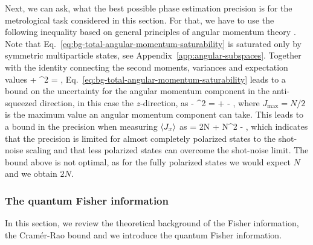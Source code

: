 Next, we can ask, what the best possible phase estimation precision is for the metrological task considered in this section.
For that, we have to use the following inequality based on general principles of angular momentum theory
\be
  \label{eq:bg-total-angular-momentum-saturability}
   \leqslant {}.
\ee
Note that Eq.~\eqref{eq:bg-total-angular-momentum-saturability} is saturated only by symmetric multiparticle states, see Appendix~\ref{app:angular-subspaces}.
Together with the identity connecting the second moments, variances and expectation values
\be
   + ^2 = ,
\ee
Eq.~\eqref{eq:bg-total-angular-momentum-saturability} leads to a bound on the uncertainty for the angular momentum component in the anti-squeezed direction, in this case the $z$-direction, as
\be
   \leqslant {} - ^2 =  +  - \rpar,
\ee
where $J_{\max}=N/2$ is the maximum value an angular momentum component can take.
This leads to a bound in the precision when measuring $\langle{J_x}\rangle$ as
\be
  \label{eq:bg-unpolarize-states-are-better}
  \varinv{\theta} = \leqslant 2N + N^2 - \rpar,
\ee
which indicates that the precision is limited for almost completely polarized states to the shot-noise scaling and that less polarized states can overcome the shot-noise limit.
The bound above is not optimal, as for the fully polarized states we would expect $N$ and we obtain $2N$.

\subsubsection{The quantum Fisher information}
\label{sec:bg-qfi}

In this section, we review the theoretical background of the Fisher information, the Cram\'er-Rao bound and we introduce the quantum Fisher information.

